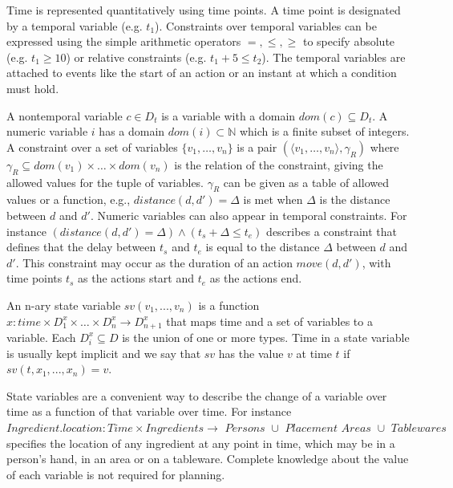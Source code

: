 Time is represented quantitatively using time points. %
A time point is designated by a temporal variable (e.g. $t_1$).
Constraints over temporal variables can be expressed using the simple arithmetic operators $=,\leq,\geq$ to specify absolute  (e.g. $t_1 \geq 10$) or relative constraints (e.g. $t_1 + 5 \leq t_2$).
The temporal variables are attached to events like the start of an action or an instant at which a condition must hold.

A nontemporal variable $c \in D_t$ is a variable with a domain $dom(c) \subseteq D_t$.
A numeric variable $i$ has a domain $dom(i) \subset \mathbb{N}$ which is a finite subset of integers.
A constraint over a set of variables $\{v_1,\dots ,v_n \}$ is a pair $(\langle v_1, \dots, v_n \rangle, \gamma_R)$ where $\gamma_R \subseteq dom(v_1) \times \dots \times dom(v_n)$ is the relation of the constraint, giving the allowed values for the tuple of variables.
$\gamma_R$ can be given as a table of allowed values or a function, e.g., $\textit{distance}(d, d') = \Delta$ is met when $\Delta$ is the distance between $d$ and $d'$.
Numeric variables can also appear in temporal constraints.
For instance $(\textit{distance}(d, d') = \Delta) \land (t_s + \Delta \leq t_e)$ describes a constraint that defines that the delay between $t_s$ and $t_e$ is equal to the distance $\Delta$ between $d$ and $d'$.
This constraint may occur as the duration of an action $move(d,d')$, with time points $t_s$ as the actions start and $t_e$ as the actions end.

\begin{definition}
  An n-ary state variable $sv(v_1,...,v_n)$ is a function $x: time \times D_1^x \times \dots \times D_n^x \rightarrow D_{n+1}^x$ that maps time and a set of variables to a variable.
  Each $D_i^x \subseteq D$ is the union of one or more types.
  Time in a state variable is usually kept implicit and we say that $sv$ has the value $v$ at time $t$ if $sv(t,x_1,...,x_n) = v$.
\end{definition}

State variables are a convenient way to describe the change of a variable over time as a function of that variable over time.
For instance $Ingredient.location: Time \times \textit{Ingredients} \rightarrow \textit{ Persons } \cup \textit{ Placement Areas } \cup \textit{ Tablewares }$ specifies the location of any ingredient at any point in time, which may be in a person's hand, in an area or on a tableware.
Complete knowledge about the value of each variable is not required for planning.

